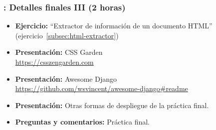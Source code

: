 \documentclass[a4paper,12pt]{article}
\begin{document}
 \subsubsection{\lunesX: Detalles finales III  (2 horas)}
 \label{cal:lunesO}

 \begin{itemize}
 \item \textbf{Ejercicio:} ``Extractor de información de un documento HTML'' (ejercicio~\ref{subsec:html-extractor})
 \item \textbf{Presentación:} CSS Garden \\
   \url{https://csszengarden.com}
 \item \textbf{Presentación:} Awesome Django \\
   \url{https://github.com/wsvincent/awesome-django#readme}
 \item \textbf{Presentación:} Otras formas de despliegue de la práctica final.
 \item \textbf{Preguntas y comentarios:} Práctica final.
 \end{itemize}






\end{document}
